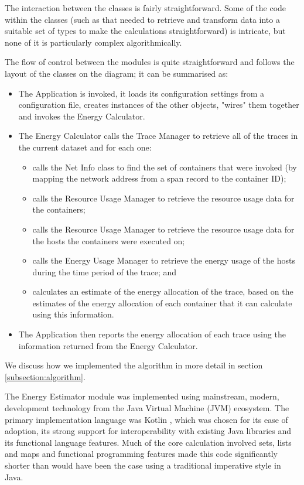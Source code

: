 The interaction between the classes is fairly straightforward.  Some of the code within the classes (such as that needed to retrieve and transform data into a suitable set of types to make the calculations straightforward) is intricate, but none of it is particularly complex algorithmically.

The flow of control between the modules is quite straightforward and follows the layout of the classes on the diagram; it can be summarised as:

\begin{itemize}
	\item The Application is invoked, it loads its configuration settings from a configuration file, creates instances of the other objects, "wires" them together and invokes the Energy Calculator.
	\item The Energy Calculator calls the Trace Manager to retrieve all of the traces in the current dataset and for each one:
	\begin{itemize}
		\item calls the Net Info class to find the set of containers that were invoked (by mapping the network address from a span record to the container ID);
		\item calls the Resource Usage Manager to retrieve the resource usage data for the containers;
		\item calls the Resource Usage Manager to retrieve the resource usage data for the hosts the containers were executed on;
		\item calls the Energy Usage Manager to retrieve the energy usage of the hosts during the time period of the trace; and
		\item calculates an estimate of the energy allocation of the trace, based on the estimates of the energy allocation of each container that it can calculate using this information.
	\end{itemize}
	\item The Application then reports the energy allocation of each trace using the information returned from the Energy Calculator. 
\end{itemize}

We discuss how we implemented the algorithm in more detail in section \ref{subsection:algorithm}.

The Energy Estimator module was implemented using mainstream, modern, development technology from the Java Virtual Machine (JVM) ecosystem.  The primary implementation language was Kotlin \cite{jemerov2017-kotlin}, which was chosen for its ease of adoption, its strong support for interoperability with existing Java libraries and its functional language features.  Much of the core calculation involved sets, lists and maps and functional programming features made this code significantly shorter than would have been the case using a traditional imperative style in Java. 

